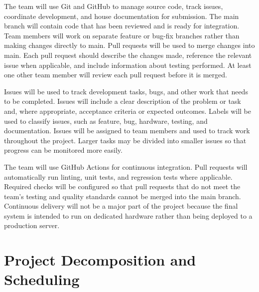 \documentclass{article}
\begin{document}

The team will use Git and GitHub to manage source code, track issues, coordinate development, and house documentation for submission. The main branch will contain code that has been reviewed and is ready for integration. Team members will work on separate feature or bug-fix branches rather than making changes directly to main. Pull requests will be used to merge changes into main. Each pull request should describe the changes made, reference the relevant issue when applicable, and include information about testing performed. At least one other team member will review each pull request before it is merged. 

Issues will be used to track development tasks, bugs, and other work that needs to be completed. Issues will include a clear description of the problem or task and, where appropriate, acceptance criteria or expected outcomes. Labels will be used to classify issues, such as feature, bug, hardware, testing, and documentation. Issues will be assigned to team members and used to track work throughout the project. Larger tasks may be divided into smaller issues so that progress can be monitored more easily. 

The team will use GitHub Actions for continuous integration. Pull requests will automatically run linting, unit tests, and regression tests where applicable. Required checks will be configured so that pull requests that do not meet the team's testing and quality standards cannot be merged into the main branch. Continuous delivery will not be a major part of the project because the final system is intended to run on dedicated hardware rather than being deployed to a production server.


\section{Project Decomposition and Scheduling}

\end{document}
